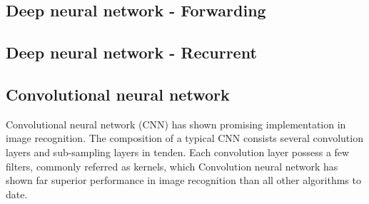 \subsection{Deep neural network - Forwarding}
\subsection{Deep neural network - Recurrent}
\subsection{Convolutional neural network}
Convolutional neural network (CNN) has shown promising implementation in image recognition. The composition of a typical CNN consists several convolution layers and sub-sampling layers in tenden. Each convolution layer possess a few filters, commonly referred as kernels, which  
Convolution neural network has shown far superior performance in image recognition than all other algorithms to date.~\cite{Szegedy_2015}